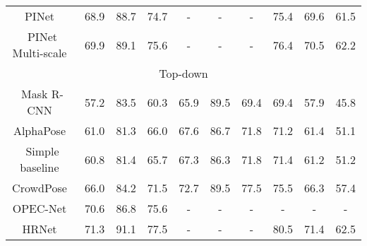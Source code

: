 \documentclass{article}
\begin{document}
\begin{table*}[h!]
{\begin{tabular}{cccccccccc}
\multicolumn{1}{c|}{PINet~\cite{wang2021robust}}                    & 68.9                     & 88.7                     & 74.7          & -             & -             & -                        & 75.4                     & 69.6                     & 61.5                     \\
\multicolumn{1}{c|}{PINet Multi-scale~\cite{wang2021robust}}        & 69.9                     & 89.1                     & 75.6          & -             & -             & -                        & 76.4                     & 70.5                     & 62.2                     \\ \hline
\multicolumn{10}{c}{Top-down}                                                                                                                                                                                                                                   \\ \hline
\multicolumn{1}{c|}{Mask R-CNN~\cite{he2017mask}}               & 57.2                     & 83.5                     & 60.3          & 65.9          & 89.5          & 69.4 & 69.4 & 57.9 & 45.8 \\
\multicolumn{1}{c|}{AlphaPose~\cite{fang2017rmpe}}                & 61.0                       & 81.3                     & 66.0            & 67.6          & 86.7          & 71.8 & 71.2 & 61.4 & 51.1 \\
\multicolumn{1}{c|}{Simple baseline~\cite{xiao2018simple}}          & 60.8                     & 81.4                     & 65.7          & 67.3          & 86.3          & \multicolumn{1}{c}{71.8} & \multicolumn{1}{c}{71.4} & \multicolumn{1}{c}{61.2} & \multicolumn{1}{c}{51.2} \\
\multicolumn{1}{c|}{CrowdPose~\cite{li2019crowdpose}}                & 66.0                       & 84.2                     & 71.5          & 72.7          & 89.5          & \multicolumn{1}{c}{77.5} & \multicolumn{1}{c}{75.5} & \multicolumn{1}{c}{66.3} & \multicolumn{1}{c}{57.4} \\
\multicolumn{1}{c|}{OPEC-Net~\cite{qiu2020peeking}}                 & 70.6                     & 86.8                     & 75.6          & -             & -             & \multicolumn{1}{c}{-}    & \multicolumn{1}{c}{-}    & \multicolumn{1}{c}{-}    & \multicolumn{1}{c}{-}    \\
\multicolumn{1}{c|}{HRNet~\cite{sun2019deep}}                & 71.3                     & 91.1                     & 77.5          & -             & -             & \multicolumn{1}{c}{-}    & \multicolumn{1}{c}{80.5} & \multicolumn{1}{c}{71.4} & \multicolumn{1}{c}{62.5} \\

\end{tabular}}
\end{table*}
\end{document}
